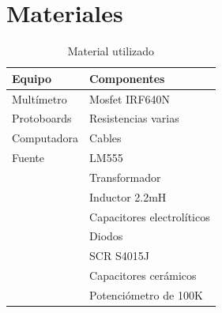 \documentclass[letterpaper]{article}
\begin{document}
\section{Materiales}
\begin{table}[hbtp]
    \centering
    \begin{tabular}{|l|l|}
    \hline
       {\color[HTML]{3166FF}\textbf{Equipo}}  &   {\color[HTML]{CB0000}\textbf{Componentes}}\\ \hline
        Multímetro  & Mosfet IRF640N\\ \hline
        Protoboards  & Resistencias varias \\ \hline
        Computadora & Cables \\ \hline
        Fuente      & LM555   \\ \hline
                    & Transformador    \\ \hline
                    & Inductor 2.2mH   \\ \hline
                    & Capacitores electrolíticos\\\hline
                    & Diodos\\\hline
                    & SCR S4015J\\\hline
                    & Capacitores cerámicos\\\hline
                    & Potenciómetro de 100K \\\hline
    \end{tabular}
    \caption{Material utilizado}
    \label{tab:materiales}
\end{table}
\end{document}
